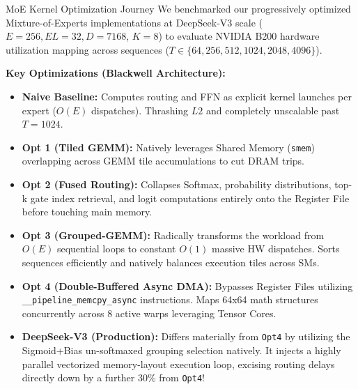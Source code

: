 
\begin{block}{MoE Kernel Optimization Journey}
We benchmarked our progressively optimized Mixture-of-Experts implementations at DeepSeek-V3 scale ($E=256, EL=32, D=7168$, $K=8$) to evaluate NVIDIA B200 hardware utilization mapping across sequences ($T \in \{64, 256, 512, 1024, 2048, 4096\}$).

\vspace{0.5em}
\textbf{Key Optimizations (Blackwell Architecture):}
\begin{itemize}
    \item \textbf{Naive Baseline:} Computes routing and FFN as explicit kernel launches per expert ($O(E)$ dispatches). Thrashing $L2$ and completely unscalable past $T=1024$.
    \item \textbf{Opt 1 (Tiled GEMM):} Natively leverages Shared Memory (\texttt{smem}) overlapping across GEMM tile accumulations to cut DRAM trips.
    \item \textbf{Opt 2 (Fused Routing):} Collapses Softmax, probability distributions, top-k gate index retrieval, and logit computations entirely onto the Register File before touching main memory.
    \item \textbf{Opt 3 (Grouped-GEMM):} Radically transforms the workload from $O(E)$ sequential loops to constant $O(1)$ massive HW dispatches. Sorts sequences efficiently and natively balances execution tiles across SMs.
    \item \textbf{Opt 4 (Double-Buffered Async DMA):} Bypasses Register Files utilizing \texttt{\_\_pipeline\_memcpy\_async} instructions. Maps 64x64 math structures concurrently across 8 active warps leveraging Tensor Cores.
    \item \textbf{DeepSeek-V3 (Production):} Differs materially from \texttt{Opt4} by utilizing the Sigmoid+Bias un-softmaxed grouping selection natively. It injects a highly parallel vectorized memory-layout execution loop, excising routing delays directly down by a further 30\% from \texttt{Opt4}!
\end{itemize}
\vspace{0.5em}


\end{block}
